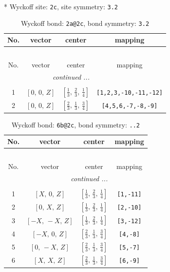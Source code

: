 \documentclass[fleqn,8pt]{jsarticle}
\begin{document}
* Wyckoff site: {\tt 2c}, site symmetry: {\tt 3.2}
\renewcommand{\arraystretch}{1.2}
\begin{longtable}{cccc}
\caption{Wyckoff bond: {\tt 2a@2c}, bond symmetry: {\tt 3.2}}
 \\
 \hline \hline
No. & vector & center & mapping \\ \hline \endfirsthead

\multicolumn{3}{l}{\tablename\ \thetable{}} \\
 \hline \hline
No. & vector & center & mapping \\ \hline \endhead

 \hline \hline
\multicolumn{3}{r}{\footnotesize\it continued ...} \\ \endfoot

 \hline \hline
\multicolumn{3}{r}{} \\ \endlastfoot

1 & $\left[ 0,\, 0,\, Z \right]$ & $\left[ \frac{1}{3},\, \frac{2}{3},\, \frac{1}{4} \right]$ & {\tt [1,2,3,-10,-11,-12]} \\ \hline
2 & $\left[ 0,\, 0,\, Z \right]$ & $\left[ \frac{2}{3},\, \frac{1}{3},\, \frac{3}{4} \right]$ & {\tt [4,5,6,-7,-8,-9]} \\
\end{longtable}
\renewcommand{\arraystretch}{1.2}
\begin{longtable}{cccc}
\caption{Wyckoff bond: {\tt 6b@2c}, bond symmetry: {\tt ..2}}
 \\
 \hline \hline
No. & vector & center & mapping \\ \hline \endfirsthead

\multicolumn{3}{l}{\tablename\ \thetable{}} \\
 \hline \hline
No. & vector & center & mapping \\ \hline \endhead

 \hline \hline
\multicolumn{3}{r}{\footnotesize\it continued ...} \\ \endfoot

 \hline \hline
\multicolumn{3}{r}{} \\ \endlastfoot

1 & $\left[ X,\, 0,\, Z \right]$ & $\left[ \frac{1}{3},\, \frac{2}{3},\, \frac{1}{4} \right]$ & {\tt [1,-11]} \\ \hline
2 & $\left[ 0,\, X,\, Z \right]$ & $\left[ \frac{1}{3},\, \frac{2}{3},\, \frac{1}{4} \right]$ & {\tt [2,-10]} \\ \hline
3 & $\left[ - X,\, - X,\, Z \right]$ & $\left[ \frac{1}{3},\, \frac{2}{3},\, \frac{1}{4} \right]$ & {\tt [3,-12]} \\ \hline
4 & $\left[ - X,\, 0,\, Z \right]$ & $\left[ \frac{2}{3},\, \frac{1}{3},\, \frac{3}{4} \right]$ & {\tt [4,-8]} \\ \hline
5 & $\left[ 0,\, - X,\, Z \right]$ & $\left[ \frac{2}{3},\, \frac{1}{3},\, \frac{3}{4} \right]$ & {\tt [5,-7]} \\ \hline
6 & $\left[ X,\, X,\, Z \right]$ & $\left[ \frac{2}{3},\, \frac{1}{3},\, \frac{3}{4} \right]$ & {\tt [6,-9]} \\
\end{longtable}
\end{document}

